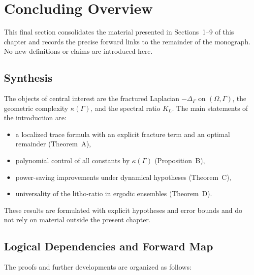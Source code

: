 
\section{Concluding Overview}

This final section consolidates the material presented in Sections~1–9 of this
chapter and records the precise forward links to the remainder of the
monograph. No new definitions or claims are introduced here.

\subsection{Synthesis}

The objects of central interest are the fractured Laplacian $-\Delta_\Gamma$ on
$(\Omega,\Gamma)$, the geometric complexity $\kappa(\Gamma)$, and the spectral
ratio $K_L$. The main statements of the introduction are:

\begin{itemize}
  \item a localized trace formula with an explicit fracture term and an
  optimal remainder (Theorem~A),
  \item polynomial control of all constants by $\kappa(\Gamma)$ (Proposition~B),
  \item power-saving improvements under dynamical hypotheses (Theorem~C),
  \item universality of the litho-ratio in ergodic ensembles (Theorem~D).
\end{itemize}

These results are formulated with explicit hypotheses and error bounds and do
not rely on material outside the present chapter.

\subsection{Logical Dependencies and Forward Map}

The proofs and further developments are organized as follows:

